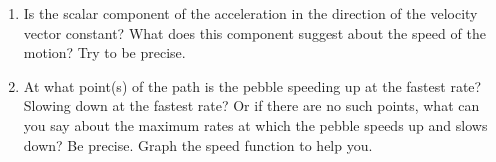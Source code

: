 \documentclass{ximera}
\begin{document}
\begin{question}
\begin{enumerate}
\begin{enumerate}
\item Is the scalar component of the acceleration in the direction of the velocity vector constant? What does this component suggest about the speed of the motion? Try to be precise.

\item At what point(s) of the path is the pebble speeding up at the fastest rate? Slowing down at the fastest rate? Or if there are no such points, what can you say about the maximum rates at which the pebble speeds up and slows down? Be precise. Graph the speed function to help you.

\end{enumerate}

\end{enumerate}

\end{question}
\end{document}
